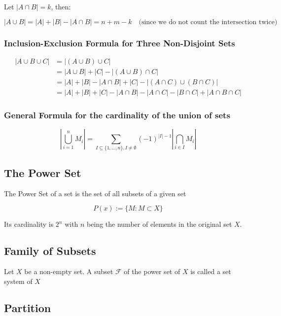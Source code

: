 Let \( |A \cap B| = k \), then:

\[
	|A \cup B| = |A| + |B| - |A \cap B| = n + m - k \quad \text{(since we do not count the intersection 
	twice)}
\]

\subsubsection{Inclusion-Exclusion Formula for Three Non-Disjoint Sets}

\begin{align*}
	|A \cup B \cup C| &= |(A \cup B) \cup C| \\ 
	&= |A \cup B| + |C| - |(A \cup B) \cap C| \\
 	&= |A| + |B| - |A \cap B| + |C| - |(A \cap C) \cup (B \cap C)|\\
	&= |A| + |B| + |C| - |A \cap B| - |A \cap C| - |B \cap C| + |A \cap B \cap C|
\end{align*}

\subsubsection{General Formula for the cardinality of the union of sets}

\[
	\left\vert \bigcup_{i = 1}^n M_i \right\vert  = \sum_{I \subseteq \{1, \dots, n\}, I \neq \emptyset}
	{(-1)}^{|I| - 1} \left\vert \bigcap_{i \in I} M_i \right\vert
\]

\subsection{The Power Set}

The Power Set of a set is the set of all subsets of a given set 

\[
	P(x):= \{ M: M \subset X\}
\]

Its cardinality is \(2^n\) with \(n\) being the number of elements in the original set \(X\).

\subsection{Family of Subsets}

Let \(X\) be a non-empty set. A subset \(\mathscr{F}\) of the power set of \(X\) is called a 
set system of \(X\)

\subsection{Partition}

